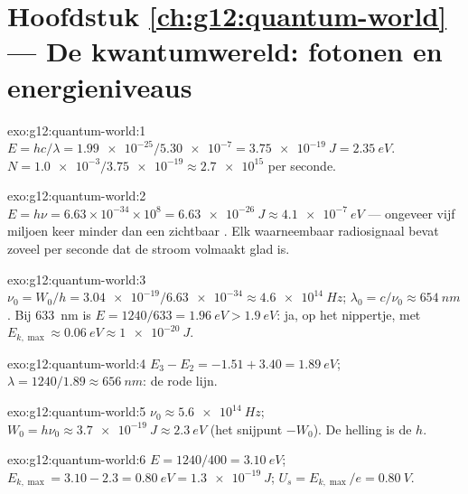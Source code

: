 \section*{Hoofdstuk \ref{ch:g12:quantum-world} --- De kwantumwereld: fotonen en energieniveaus}

\begin{solution}{exo:g12:quantum-world:1}
$E = hc/\lambda = \num{1.99e-25}/\num{5.30e-7} = \qty{3.75e-19}{J} =
\qty{2.35}{eV}$. $N = \num{1.0e-3}/\num{3.75e-19} \approx \num{2.7e15}$
 per seconde.
\end{solution}

\begin{solution}{exo:g12:quantum-world:2}
$E = h\nu = 6.63\times10^{-34} \times 10^{8} = \qty{6.63e-26}{J}
\approx \qty{4.1e-7}{eV}$ --- ongeveer vijf miljoen keer minder dan een
zichtbaar . Elk waarneembaar radiosignaal bevat zoveel  per
seconde dat de stroom volmaakt glad is.
\end{solution}

\begin{solution}{exo:g12:quantum-world:3}
$\nu_0 = W_0/h = \num{3.04e-19}/\num{6.63e-34} \approx \qty{4.6e14}{Hz}$;
$\lambda_0 = c/\nu_0 \approx \qty{654}{nm}$. Bij \qty{633}{nm} is
$E = 1240/633 = \qty{1.96}{eV} > \qty{1.9}{eV}$: ja, op het nippertje, met
$E_{k,\max} \approx \qty{0.06}{eV} \approx \qty{1e-20}{J}$.
\end{solution}

\begin{solution}{exo:g12:quantum-world:4}
$E_3 - E_2 = -1.51 + 3.40 = \qty{1.89}{eV}$;
$\lambda = 1240/1.89 \approx \qty{656}{nm}$: de rode lijn.
\end{solution}

\begin{solution}{exo:g12:quantum-world:5}
$\nu_0 \approx \qty{5.6e14}{Hz}$; $W_0 = h\nu_0 \approx \qty{3.7e-19}{J}
\approx \qty{2.3}{eV}$ (het snijpunt $-W_0$). De helling is de  $h$.
\end{solution}

\begin{solution}{exo:g12:quantum-world:6}
$E = 1240/400 = \qty{3.10}{eV}$; $E_{k,\max} = 3.10 - 2.3 = \qty{0.80}{eV} =
\qty{1.3e-19}{J}$; $U_s = E_{k,\max}/e = \qty{0.80}{V}$.
\end{solution}


